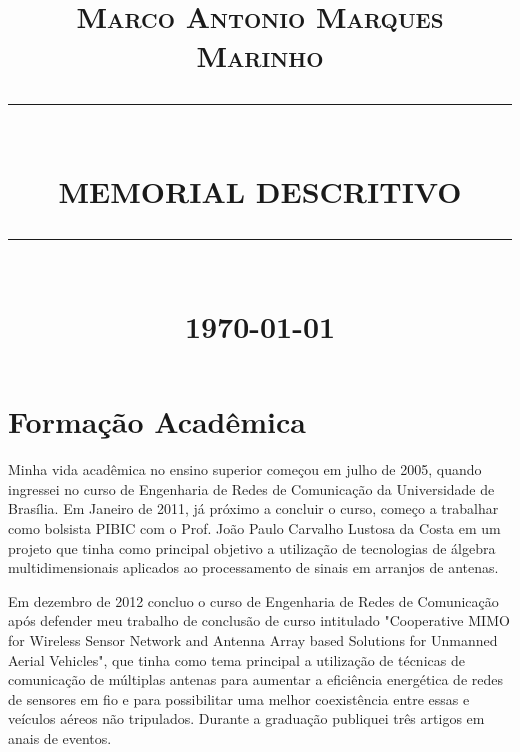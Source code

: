 \documentclass[12pt]{article}
\newcommand{\HRule}[1]{\rule{\linewidth}{#1}}
\begin{document}
\title{ \Large \textsc{Marco Antonio Marques Marinho}
		\\ [2.0cm]
		\HRule{0.5pt} \\
		\LARGE \textbf{\uppercase{Memorial Descritivo}}
		\HRule{2pt} \\ [0.5cm]
		\normalsize \today \vspace*{5\baselineskip}}

\date{}


\maketitle
\newpage

\tableofcontents
\newpage

\sectionfont{\scshape}


\section{Formação Acadêmica}

Minha vida acadêmica no ensino superior começou em julho de 2005, quando ingressei no curso de Engenharia de Redes de Comunicação da Universidade de Brasília. Em Janeiro de 2011, já próximo a concluir o curso, começo a trabalhar como bolsista PIBIC com o Prof. João Paulo Carvalho Lustosa da Costa em um projeto que tinha como  principal objetivo a utilização de tecnologias de álgebra multidimensionais aplicados ao processamento de sinais em arranjos de antenas.

Em dezembro de 2012 concluo o curso de Engenharia de Redes de Comunicação após defender meu trabalho de conclusão de curso intitulado "Cooperative MIMO for Wireless Sensor Network and Antenna Array based Solutions for Unmanned Aerial Vehicles", que tinha como tema principal a utilização de técnicas de comunicação de múltiplas antenas para aumentar a eficiência energética de redes de sensores em fio e para possibilitar uma melhor coexistência entre essas e veículos aéreos não tripulados. Durante a graduação publiquei três artigos em anais de eventos.
\end{document}

